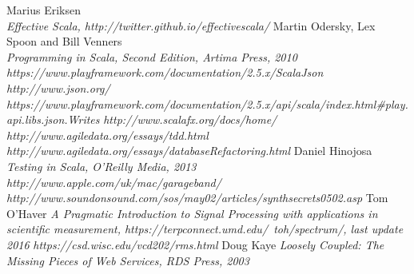 \documentclass[a4paper, 11pt]{article}
\begin{document}
\begin{thebibliography}{99}
Marius Eriksen\\
\textit{Effective Scala, http://twitter.github.io/effectivescala/}
Martin Odersky, Lex Spoon and Bill Venners\\
\textit{Programming in Scala, Second Edition, Artima Press, 2010}
\textit{https://www.playframework.com/documentation/2.5.x/ScalaJson}
\textit{http://www.json.org/}
\textit{https://www.playframework.com/documentation/2.5.x/api/scala/index.html\#play.api.libs.json.Writes}
\textit{http://www.scalafx.org/docs/home/}
\textit{http://www.agiledata.org/essays/tdd.html}
\textit{http://www.agiledata.org/essays/databaseRefactoring.html}
Daniel Hinojosa
\textit{Testing in Scala, O’Reilly Media, 2013}
\textit{http://www.apple.com/uk/mac/garageband/}
\textit{http://www.soundonsound.com/sos/may02/articles/synthsecrets0502.asp}
Tom O'Haver
\textit{A Pragmatic Introduction to Signal Processing with applications in scientific measurement, https://terpconnect.umd.edu/~toh/spectrum/, last update 2016}
\textit{https://csd.wisc.edu/vcd202/rms.html}
Doug Kaye
\textit{Loosely Coupled: The Missing Pieces of Web Services, RDS Press, 2003}
\end{thebibliography}
\end{document}
